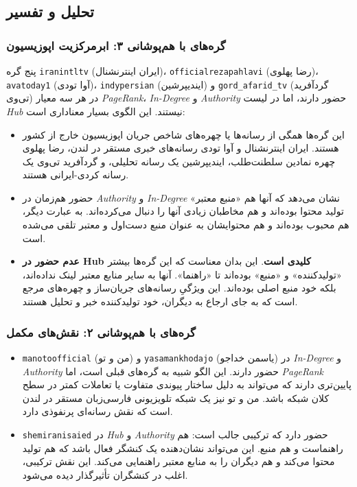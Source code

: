 \documentclass{article}
\begin{document}
	
	
	
	\subsection{تحلیل و تفسیر}
	
	\subsubsection*{گره‌های با هم‌پوشانی ۳: ابرمرکزیت اپوزیسیون}
	پنج گره \texttt{iranintltv} (ایران اینترنشنال)، \texttt{officialrezapahlavi} (رضا پهلوی)، \texttt{avatoday1} (آوا تودی)، \texttt{indypersian} (ایندیپرشین) و \texttt{gord\_afarid\_tv} (گردآفرید تی‌وی) در هر سه معیار \textit{PageRank}، \textit{In-Degree} و \textit{Authority} حضور دارند، اما در لیست \textit{Hub} نیستند. این الگوی بسیار معناداری است:
	
	\begin{itemize}
		\item این گره‌ها همگی از رسانه‌ها یا چهره‌های شاخص جریان اپوزیسیون خارج از کشور هستند. ایران اینترنشنال و آوا تودی رسانه‌های خبری مستقر در لندن، رضا پهلوی چهره نمادین سلطنت‌طلب، ایندیپرشین یک رسانه تحلیلی، و گردآفرید تی‌وی یک رسانه کردی-ایرانی هستند.
		\item حضور هم‌زمان در \textit{Authority} و \textit{In-Degree} نشان می‌دهد که آنها هم «منبع معتبر» تولید محتوا بوده‌اند و هم مخاطبان زیادی آنها را دنبال می‌کرده‌اند. به عبارت دیگر، هم محبوب بوده‌اند و هم محتوایشان به عنوان منبع دست‌اول و معتبر تلقی می‌شده است.
		\item \textbf{عدم حضور در Hub کلیدی است}. این بدان معناست که این گره‌ها بیشتر «تولیدکننده» و «منبع» بوده‌اند تا «راهنما». آنها به سایر منابع معتبر لینک نداده‌اند، بلکه خود منبع اصلی بوده‌اند. این ویژگیِ رسانه‌های جریان‌ساز و چهره‌های مرجع است که به جای ارجاع به دیگران، خود تولیدکننده خبر و تحلیل هستند.
	\end{itemize}
	
	\subsubsection*{گره‌های با هم‌پوشانی ۲: نقش‌های مکمل}
	\begin{itemize}
		\item \texttt{manotoofficial} (من و تو) و \texttt{yasamankhodajo} (یاسمن خداجو) در \textit{In-Degree} و \textit{Authority} حضور دارند. این الگو شبیه به گره‌های قبلی است، اما \textit{PageRank} پایین‌تری دارند که می‌تواند به دلیل ساختار پیوندی متفاوت یا تعاملات کمتر در سطح کلان شبکه باشد. من و تو نیز یک شبکه تلویزیونی فارسی‌زبان مستقر در لندن است که نقش رسانه‌ای پرنفوذی دارد.
		\item \texttt{shemiranisaied} در \textit{Hub} و \textit{Authority} حضور دارد که ترکیبی جالب است: هم راهنماست و هم منبع. این می‌تواند نشان‌دهنده یک کنشگر فعال باشد که هم تولید محتوا می‌کند و هم دیگران را به منابع معتبر راهنمایی می‌کند. این نقش ترکیبی، اغلب در کنشگران تأثیرگذار دیده می‌شود.
	\end{itemize}
	
\end{document}
